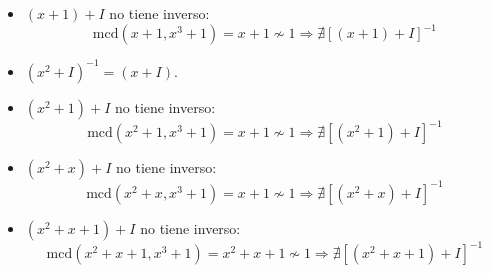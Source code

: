 \documentclass[12pt]{article}
\newcounter{ejercicio}[section] %
\newcounter{ejercicio}
\begin{document}
\begin{ejercicio}
\begin{itemize}
            \item $(x+1)+I$ no tiene inverso:
                $$\mbox{mcd}(x+1,x^3+1)=x+1 \nsim 1 \Rightarrow \nexists[(x+1)+I]^{-1}$$
            \item $(x^2+I)^{-1} = (x+I)$.
            \item $(x^2+1)+I$ no tiene inverso:
                $$\mbox{mcd}(x^2+1, x^3+1) = x+1 \nsim 1 \Rightarrow \nexists [(x^2+1)+I]^{-1}$$
            \item $(x^2+x)+I$ no tiene inverso:
                $$\mbox{mcd}(x^2+x, x^3+1) = x+1 \nsim 1 \Rightarrow \nexists [(x^2+x)+I]^{-1}$$
            \item $(x^2+x+1)+I$ no tiene inverso:
                $$\mbox{mcd}(x^2+x+1, x^3+1) = x^2+x+1 \nsim 1 \Rightarrow \nexists [(x^2+x+1)+I]^{-1}$$


        \end{itemize}
    \end{ejercicio}
\end{document}
